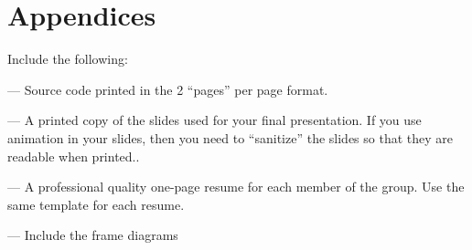 \documentclass{article}
\numberwithin{equation}{section} %
\begin{document}
\section{Appendices}
 Include the following:
 
 --- Source code printed in the 2 “pages” per page format.
 
 --- A printed copy of the slides used for your ﬁnal presentation. If you use animation in your slides, then you need to “sanitize” the slides so that they are readable when printed..
 
 --- A professional quality one-page resume for each member of the group. Use the same template for each resume.
 
 --- Include the frame diagrams
\end{document}
